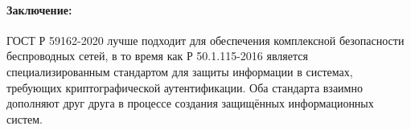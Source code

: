 \paragraph{Заключение:}
ГОСТ Р 59162-2020 лучше подходит для обеспечения комплексной безопасности беспроводных сетей, в то время как Р 50.1.115-2016 является специализированным стандартом для защиты информации в системах, требующих криптографической аутентификации.
Оба стандарта взаимно дополняют друг друга в процессе создания защищённых информационных систем.
